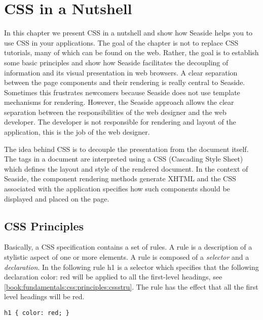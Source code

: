 \documentclass[a4paper,10pt,twoside]{book}
\newcommand{\ct}[1]{{\small\ttfamily\textup{#1}}}
\begin{document}
\chapter{CSS in a Nutshell}
\label{book:fundamentals:css}

In this chapter we present CSS in a nutshell and show how Seaside helps you to use CSS in your applications. The goal of the chapter is not to replace CSS tutorials, many of which can be found on the web. Rather, the goal is to establish some basic principles and show how Seaside facilitates the decoupling of information and its visual presentation in web browsers. A clear separation between the page components and their rendering is really central to Seaside. Sometimes this frustrates newcomers because Seaside does not use template mechanisms for rendering. However, the Seaside approach allows the clear separation between the responsibilities of the web designer and the web developer. The developer is not responsible for rendering and layout of the application, this is the job of the web designer.

The idea behind CSS is to decouple the presentation from the document itself. The tags in a document are interpreted using a CSS (Cascading Style Sheet) which defines the layout and style of the rendered document. In the context of Seaside, the component rendering methods generate XHTML and the CSS associated with the application specifies how such components should be displayed and placed on the page.

\section{CSS Principles}
\label{book:fundamentals:css:principles}

Basically, a CSS specification contains a set of rules. A rule is a description of a stylistic aspect of one or more elements. A rule is composed of a \textit{selector} and a \textit{declaration}. In the following rule \ct{h1} is a selector which specifies that the following declaration \ct{color: red} will be applied to all the first-level headings, see \autoref{book:fundamentals:css:principles:cssstru}. The rule has the effect that all the first level headings will be red.

\begin{lstlisting}
h1 { color: red; }
\end{lstlisting}
\end{document}

